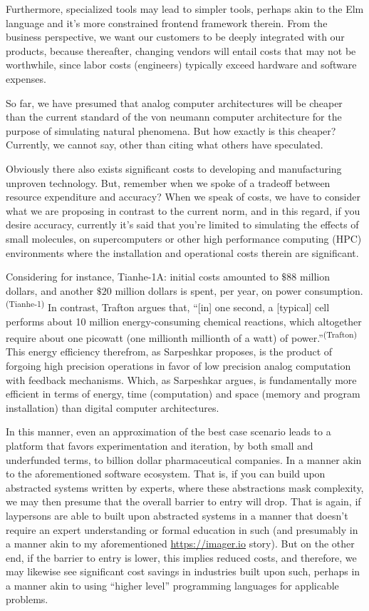 Furthermore, specialized tools may lead to simpler tools, perhaps akin to the Elm language and it's more constrained frontend framework therein. From the business perspective, we want our customers to be deeply integrated with our products, because thereafter, changing vendors will entail costs that may not be worthwhile, since labor costs (engineers) typically exceed hardware and software expenses.

So far, we have presumed that analog computer architectures will be cheaper than the current standard of the von neumann computer architecture for the purpose of simulating natural phenomena. But how exactly is this cheaper? Currently, we cannot say, other than citing what others have speculated.


Obviously there also exists significant costs to developing and manufacturing unproven technology. But, remember when we spoke of a tradeoff between resource expenditure and accuracy? When we speak of costs, we have to consider what we are proposing in contrast to the current norm, and in this regard, if you desire accuracy, currently it's said that you're limited to simulating the effects of small molecules, on supercomputers or other high performance computing (HPC) environments where the installation and operational costs therein are significant.

Considering for instance, Tianhe-1A: initial costs amounted to $\$88$ million dollars, and another $\$20$ million dollars is spent, per year, on power consumption.\textsuperscript{(Tianhe-1)} In contrast, Trafton argues that, ``[in] one second, a [typical] cell performs about 10 million energy-consuming chemical reactions, which altogether require about one picowatt (one millionth millionth of a watt) of power.''\textsuperscript{(Trafton)} This energy efficiency therefrom, as Sarpeshkar proposes, is the product of forgoing high precision operations in favor of low precision analog computation with feedback mechanisms. Which, as Sarpeshkar argues, is fundamentally more efficient in terms of energy, time (computation) and space (memory and program installation) than digital computer architectures.

In this manner, even an approximation of the best case scenario leads to a platform that favors experimentation and iteration, by both small and underfunded terms, to billion dollar pharmaceutical companies. In a manner akin to the aforementioned software ecosystem. That is, if you can build upon abstracted systems written by experts, where these abstractions mask complexity, we may then presume that the overall barrier to entry will drop. That is again, if laypersons are able to built upon abstracted systems in a manner that doesn't require an expert understanding or formal education in such (and presumably in a manner akin to my aforementioned \url{https://imager.io} story). But on the other end, if the barrier to entry is lower, this implies reduced costs, and therefore, we may likewise see significant cost savings in industries built upon such, perhaps in a manner akin to using ``higher level'' programming languages for applicable problems. 


